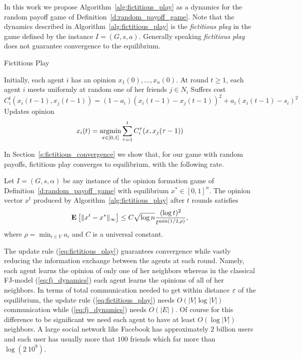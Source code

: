 In this work we propose Algorithm~\ref{alg:fictitious_play} as a dynamics
for the random payoff game of Definition~\ref{d:random_payoff_game}.
Note that the dynamics described in Algorithm~\ref{alg:fictitious_play} is the
\emph{fictitious play} in the game defined by the instance
$I=(G,s,a)$. Generally speaking \emph{fictitious play} does not guarantee
convergence to the equilibrium.
\begin{algorithm}
  \caption{Fictitious Play}
  \label{alg:fictitious_play}
  \begin{algorithmic}[1]
    \State Initially, each agent $i$ has an opinion $x_1(0),\ldots,x_n(0)$.
    \State At round $t \geq 1$, each agent $i$ meets uniformly at random one of
    her friends $j \in N_i$
    \State Suffers cost
    \(
      C^t_i(x_i(t-1),x_{j}(t-1))=(1-a_i)(x_i(t-1)
      -x_j(t-1))^2 + a_i(x_i(t-1)-s_i)^2
    \)
    \State Updates opinion
    \begin{equation}\label{eq:fictitious_play}
      x_i(t) =
      \operatorname*{argmin}_{x \in [0,1]}
      \sum_{\tau=1}^tC^{\tau}_i(x,x_j(\tau-1))
    \end{equation}
\end{algorithmic}
\end{algorithm}
In Section~\ref{s:fictitious_convergence} we show that, for our game with
random payoffs, fictitious play converges to equilibrium, with the following
rate.
\begin{theorem}
  Let $I = (G,s, \alpha)$ be any instance of the opinion formation
  game of Definition~\ref{d:random_payoff_game} with equilibrium
  $x^* \in [0,1]^n$.  The opinion vector $x^t$ produced by
  Algorithm~\ref{alg:fictitious_play} after $t$ rounds satisfies
  \[
    \bm{\mathrm{E}}_{} \left[ \| x^t - x^* \|_{\infty} \right] \leq
    C \sqrt{\log n}\frac{(\log t)^{2}}{t^{\min(1/2,\rho)}},
  \]
  where $\rho = \min_{i \in V} a_i$ and $C$ is a universal constant.
\end{theorem}
The update rule (\ref{eq:fictitious_play}) guarantees convergence
while vastly reducing the information exchange between the agents
at each round.
Namely, each agent learns the opinion of only one of her neighbors
whereas in the classical FJ-model (\ref{eq:fj_dynamics}) each agent
learns the opinions of all of her neighbors. In terms of
total communication needed to get within distance $\varepsilon$ of the
equilibrium, the update rule (\ref{eq:fictitious_play}) needs
$O(|V| \log |V|)$ communication while (\ref{eq:fj_dynamics}) needs
$O(|E|)$. Of course for this difference to be significant we need
each agent to have at least $O(\log |V|)$ neighbors.  A large social
network like Facebook has approximately $2$ billion users and each user
has usually more that $100$ friends which far more than $\log(2\ 10^9)$.

